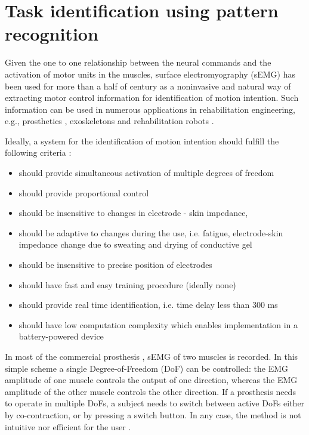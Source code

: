 \section{Task identification using pattern recognition}

Given the one to one relationship between the neural commands and the activation of motor units in the muscles, surface electromyography (sEMG) has been used for more than a half of century as a noninvasive and natural way of extracting motor control information for identification of motion intention. Such information can be used in numerous applications in rehabilitation engineering, e.g., prosthetics \citep{Li2010, Young2013, Stango2015}, exoskeletons \citep{VacaBenitez2013} and rehabilitation robots \citep{Dipietro2005, Marchal-Crespo2009, Cesqui2013}.

Ideally, a system for the identification of motion intention should fulfill the following criteria \citep{Farina2014}:
\begin{itemize}
\item should provide simultaneous activation of multiple degrees of freedom
\item should provide proportional control
\item should be insensitive to changes in electrode - skin impedance,
\item should be adaptive to changes during the use, i.e. fatigue, electrode-skin impedance change due to sweating and drying of conductive gel
\item should be insensitive to precise position of electrodes
\item should have fast and easy training procedure (ideally none)
\item should provide real time identification, i.e. time delay less than 300 ms \citep{Oskoei2007}
\item should have low computation complexity which enables implementation in a battery-powered device
\end{itemize}

In most of the commercial prosthesis \citep{Parker1986}, sEMG of two muscles is recorded. In this simple scheme a single Degree-of-Freedom (DoF) can be controlled: the EMG amplitude of one muscle controls the output of one direction, whereas the EMG amplitude of the other muscle controls the other direction. If a prosthesis needs to operate in multiple DoFs, a subject needs to switch between active DoFs either by co-contraction, or by pressing a switch button. In any case, the method is not intuitive nor efficient for the user \citep{Farina2014}.

